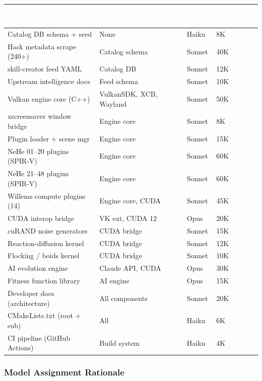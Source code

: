 \documentclass[11pt,letterpaper]{article}
\newcommand{\tableheader}[1]{\textbf{\sffamily\textcolor{white}{#1}}}
\begin{document}
\begin{center}
\begin{tabularx}{\textwidth}{L{3.5cm}L{2.5cm}C{1.8cm}C{2cm}}
\toprule
{}
\tableheader{Component} & \tableheader{Dependencies} & \tableheader{Model} & \tableheader{Est. Tokens} \\
\midrule
Catalog DB schema + seed & None & Haiku & 8K \\
Hack metadata scrape (240+) & Catalog schema & Sonnet & 40K \\
skill-creator feed YAML & Catalog DB & Sonnet & 12K \\
Upstream intelligence docs & Feed schema & Sonnet & 10K \\
Vulkan engine core (C++) & VulkanSDK, XCB, Wayland & Sonnet & 50K \\
xscreensaver window bridge & Engine core & Sonnet & 8K \\
Plugin loader + scene mgr & Engine core & Sonnet & 15K \\
NeHe 01--20 plugins (SPIR-V) & Engine core & Sonnet & 60K \\
NeHe 21--48 plugins (SPIR-V) & Engine core & Sonnet & 60K \\
Willems compute plugins (14) & Engine core, CUDA & Sonnet & 45K \\
CUDA interop bridge & VK ext, CUDA 12 & Opus & 20K \\
cuRAND noise generators & CUDA bridge & Sonnet & 15K \\
Reaction-diffusion kernel & CUDA bridge & Sonnet & 12K \\
Flocking / boids kernel & CUDA bridge & Sonnet & 10K \\
AI evolution engine & Claude API, CUDA & Opus & 30K \\
Fitness function library & AI engine & Opus & 15K \\
Developer docs (architecture) & All components & Sonnet & 20K \\
CMakeLists.txt (root + sub) & All & Haiku & 6K \\
CI pipeline (GitHub Actions) & Build system & Haiku & 4K \\
\bottomrule
\end{tabularx}
\end{center}

\subsubsection{Model Assignment Rationale}
\end{document}
